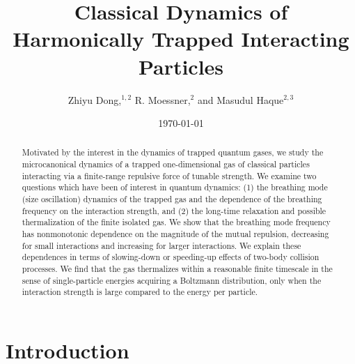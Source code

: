\documentclass[a4paper, onecolumn]{revtex4-1}
\begin{document}
\title{Classical Dynamics of Harmonically Trapped Interacting Particles}

\author{
Zhiyu Dong,$^{1,2}$
R. Moessner,$^2$
and Masudul Haque$^{2,3}$}





\date{\today}
 
 
\begin{abstract}

Motivated by the interest in the dynamics of trapped quantum gases, we study the microcanonical
dynamics of a trapped one-dimensional gas of classical particles interacting via a finite-range
repulsive force of tunable strength.  We examine two questions which have been of interest in
quantum dynamics: (1) the breathing mode (size oscillation) dynamics of the trapped gas and the
dependence of the breathing frequency on the interaction strength, and (2) the long-time relaxation
and possible thermalization of the finite isolated gas.
%
We show that the breathing mode frequency has nonmonotonic dependence on the magnitude of the mutual
repulsion, decreasing for small interactions and increasing for larger interactions.  We explain
these dependences in terms of slowing-down or speeding-up effects of two-body collision processes.
We find that the gas thermalizes within a reasonable finite timescale in the sense of
single-particle energies acquiring a Boltzmann distribution, only when the interaction strength is
large compared to the energy per particle.  

  
\end{abstract}

\maketitle


\section{Introduction}
\end{document}
